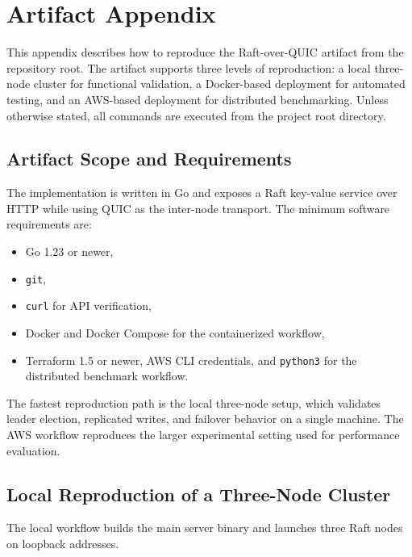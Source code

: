\appendices
\section{Artifact Appendix}
\label{appendix:artifact}

This appendix describes how to reproduce the Raft-over-QUIC artifact from the repository root. The artifact supports three levels of reproduction: a local three-node cluster for functional validation, a Docker-based deployment for automated testing, and an AWS-based deployment for distributed benchmarking. Unless otherwise stated, all commands are executed from the project root directory.

\subsection{Artifact Scope and Requirements}

The implementation is written in Go and exposes a Raft key-value service over HTTP while using QUIC as the inter-node transport. The minimum software requirements are:
\begin{itemize}
\item Go 1.23 or newer,
\item \texttt{git},
\item \texttt{curl} for API verification,
\item Docker and Docker Compose for the containerized workflow,
\item Terraform 1.5 or newer, AWS CLI credentials, and \texttt{python3} for the distributed benchmark workflow.
\end{itemize}

The fastest reproduction path is the local three-node setup, which validates leader election, replicated writes, and failover behavior on a single machine. The AWS workflow reproduces the larger experimental setting used for performance evaluation.

\subsection{Local Reproduction of a Three-Node Cluster}

The local workflow builds the main server binary and launches three Raft nodes on loopback addresses.

